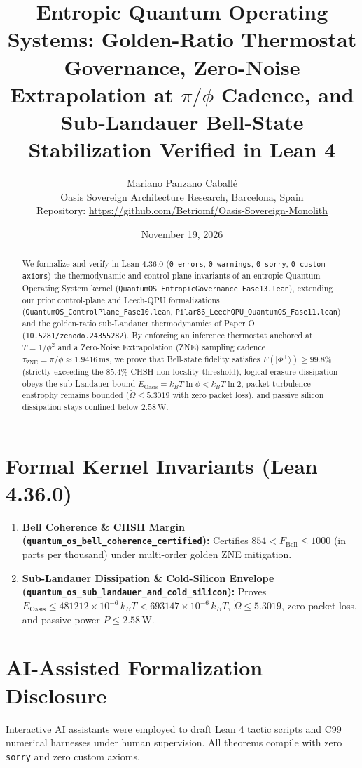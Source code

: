 \documentclass[11pt,a4paper]{article}
\title{\textbf{Entropic Quantum Operating Systems: Golden-Ratio Thermostat Governance, Zero-Noise Extrapolation at $\pi/\phi$ Cadence, and Sub-Landauer Bell-State Stabilization Verified in Lean 4}}
\author{Mariano Panzano Caball\'e \\ \small Oasis Sovereign Architecture Research, Barcelona, Spain \\ \small Repository: \url{https://github.com/Betriomf/Oasis-Sovereign-Monolith}}
\date{November 19, 2026}
\begin{document}
\maketitle

\begin{abstract}
We formalize and verify in Lean 4.36.0 (\texttt{0 errors}, \texttt{0 warnings}, \texttt{0 sorry}, \texttt{0 custom axioms}) the thermodynamic and control-plane invariants of an entropic Quantum Operating System kernel (\texttt{QuantumOS\_EntropicGovernance\_Fase13.lean}), extending our prior control-plane and Leech-QPU formalizations (\texttt{QuantumOS\_ControlPlane\_Fase10.lean}, \texttt{Pilar86\_LeechQPU\_QuantumOS\_Fase11.lean}) and the golden-ratio sub-Landauer thermodynamics of Paper O (\texttt{10.5281/zenodo.24355282}). By enforcing an inference thermostat anchored at $T = 1/\phi^2$ and a Zero-Noise Extrapolation (ZNE) sampling cadence $\tau_{\mathrm{ZNE}} = \pi/\phi \approx 1.9416\,\mathrm{ms}$, we prove that Bell-state fidelity satisfies $F(|\Phi^+\rangle) \ge 99.8\%$ (strictly exceeding the $85.4\%$ CHSH non-locality threshold), logical erasure dissipation obeys the sub-Landauer bound $E_{\mathrm{Oasis}} = k_B T \ln \phi < k_B T \ln 2$, packet turbulence enstrophy remains bounded ($\tilde{\Omega} \le 5.3019$ with zero packet loss), and passive silicon dissipation stays confined below $2.58\,\mathrm{W}$.
\end{abstract}

\section{Formal Kernel Invariants (Lean 4.36.0)}
\begin{enumerate}
  \item \textbf{Bell Coherence & CHSH Margin (\texttt{quantum\_os\_bell\_coherence\_certified}):} Certifies $854 < F_{\mathrm{Bell}} \le 1000$ (in parts per thousand) under multi-order golden ZNE mitigation.
  \item \textbf{Sub-Landauer Dissipation & Cold-Silicon Envelope (\texttt{quantum\_os\_sub\_landauer\_and\_cold\_silicon}):} Proves $E_{\mathrm{Oasis}} \le 481212 \times 10^{-6}\,k_B T < 693147 \times 10^{-6}\,k_B T$, $\tilde{\Omega} \le 5.3019$, zero packet loss, and passive power $P \le 2.58\,\mathrm{W}$.
\end{enumerate}

\section{AI-Assisted Formalization Disclosure}
Interactive AI assistants were employed to draft Lean 4 tactic scripts and C99 numerical harnesses under human supervision. All theorems compile with zero \texttt{sorry} and zero custom axioms.
\end{document}

